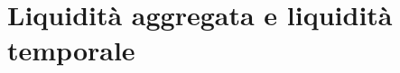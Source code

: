 \documentclass[handout]{beamer}%
\newenvironment{stepitemize}{\begin{itemize}[<+->]}{\end{itemize} }
\providecommand{\QTR}[2]{\csname #1\endcsname{#2}}
\begin{document}
 
 
 
 
 
 
 
 
 
 

\section{Liquidit\`a aggregata e liquidit\`a temporale}
\end{document}
